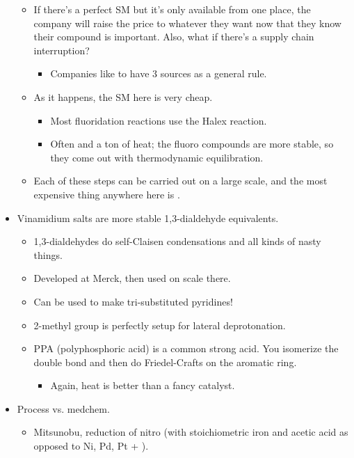 \documentclass[../notes.tex]{subfiles}
\begin{document}
\begin{itemize}
\begin{itemize}
\begin{itemize}
        \end{itemize}
        \item If there's a perfect SM but it's only available from one place, the company will raise the price to whatever they want now that they know their compound is important. Also, what if there's a supply chain interruption?
        \begin{itemize}
            \item Companies like to have 3 sources as a general rule.
        \end{itemize}
        \item As it happens, the SM here is very cheap.
        \begin{itemize}
            \item Most fluoridation reactions use the Halex reaction.
            \item Often  and a ton of heat; the fluoro compounds are more stable, so they come out with thermodynamic equilibration.
        \end{itemize}
        \item Each of these steps can be carried out on a large scale, and the most expensive thing anywhere here is .
    \end{itemize}
    \item Vinamidium salts are more stable 1,3-dialdehyde equivalents.
    \begin{itemize}
        \item 1,3-dialdehydes do self-Claisen condensations and all kinds of nasty things.
        \item Developed at Merck, then used on scale there.
        \item Can be used to make tri-substituted pyridines!
        \item 2-methyl group is perfectly setup for lateral deprotonation.
        \item PPA (polyphosphoric acid) is a common strong acid. You isomerize the double bond and then do Friedel-Crafts on the aromatic ring.
        \begin{itemize}
            \item Again, heat is better than a fancy catalyst.
        \end{itemize}
    \end{itemize}
    \item Process vs. medchem.
    \begin{itemize}
        \item Mitsunobu, reduction of nitro (with stoichiometric iron and acetic acid as opposed to Ni, Pd, Pt + ).

\end{itemize}
\end{itemize}
\end{document}
